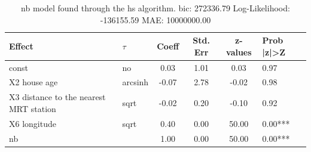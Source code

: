 \begin{table}
	\caption{nb model found through the hs algorithm. bic: 272336.79 Log-Likelihood: -136155.59 MAE: 10000000.00}
	\begin{center}
		\begin{tabular}{|l|l|c|c|c|l|}
			\hline
			Effect & $\tau$ & Coeff & Std. Err & z-values & Prob |z|>Z \\
			\hline
			const & no & 0.03 & 1.01 & 0.03 & 0.97 \\
			\hline
			X2 house age & arcsinh & -0.07 & 2.78 & -0.02 & 0.98 \\
			\hline
			X3 distance to the nearest MRT station & sqrt & -0.02 & 0.20 & -0.10 & 0.92 \\
			\hline
			X6 longitude & sqrt & 0.40 & 0.00 & 50.00 & 0.00*** \\
			\hline
			nb &  & 1.00 & 0.00 & 50.00 & 0.00*** \\
			\hline
		\end{tabular}
	\end{center}
\end{table}